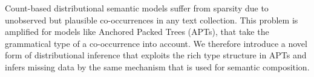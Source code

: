 Count-based distributional semantic models suffer from sparsity due to unobserved but plausible co-occurrences in any text collection. This problem is amplified for models like Anchored Packed Trees (APTs), that take the grammatical type of a co-occurrence into account. We therefore introduce a novel form of distributional inference that exploits the rich type structure in APTs and infers missing data by the same mechanism that is used for semantic composition.
